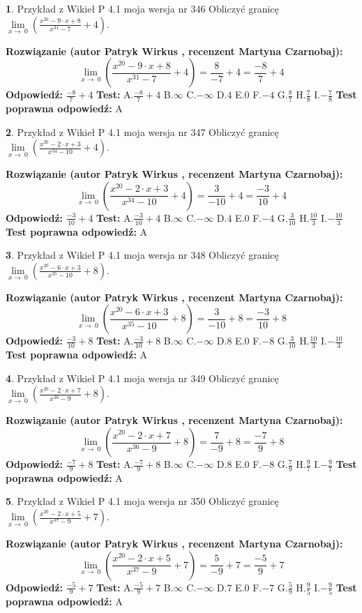 \documentclass[12pt, a4paper]{article}
\theoremstyle{definition} %
\newtheorem{zad}{}
\newcommand{\zadStart}[1]{\begin{zad}#1\newline}
\newcommand{\zadStop}{\end{zad}}
\newcommand{\rozwStart}[2]{\noindent \textbf{Rozwiązanie (autor #1 , recenzent #2): }\newline}
\newcommand{\rozwStop}{\newline}
\newcommand{\odpStart}{\noindent \textbf{Odpowiedź:}\newline}
\newcommand{\odpStop}{\newline}
\newcommand{\testStart}{\noindent \textbf{Test:}\newline}
\newcommand{\testStop}{\newline}
\newcommand{\kluczStart}{\noindent \textbf{Test poprawna odpowiedź:}\newline}
\newcommand{\kluczStop}{\newline}
\begin{document}
\zadStart{Przykład z Wikieł P 4.1 moja wersja nr 346}
Obliczyć granicę $\lim\limits_{x\to\ 0}(\frac{x^{20}-9 \cdot x +8}{x^{31}-7}+4)$.
\zadStop
\rozwStart{Patryk Wirkus}{Martyna Czarnobaj}
$$\lim\limits_{x\to\ 0}(\frac{x^{20}-9 \cdot x +8}{x^{31}-7}+4)=\frac{8}{-7}+4=\frac{-8}{7}+4$$
\rozwStop
\odpStart
$\frac{-8}{7}+4$
\odpStop
\testStart
A.$\frac{-8}{7}+4$
B.$\infty$
C.$-\infty$
D.$4$
E.$0$
F.$-4$
G.$\frac{8}{7}$
H.$\frac{7}{8}$
I.$-\frac{7}{8}$
\testStop
\kluczStart
A
\kluczStop



\zadStart{Przykład z Wikieł P 4.1 moja wersja nr 347}
Obliczyć granicę $\lim\limits_{x\to\ 0}(\frac{x^{20}-2 \cdot x +3}{x^{34}-10}+4)$.
\zadStop
\rozwStart{Patryk Wirkus}{Martyna Czarnobaj}
$$\lim\limits_{x\to\ 0}(\frac{x^{20}-2 \cdot x +3}{x^{34}-10}+4)=\frac{3}{-10}+4=\frac{-3}{10}+4$$
\rozwStop
\odpStart
$\frac{-3}{10}+4$
\odpStop
\testStart
A.$\frac{-3}{10}+4$
B.$\infty$
C.$-\infty$
D.$4$
E.$0$
F.$-4$
G.$\frac{3}{10}$
H.$\frac{10}{3}$
I.$-\frac{10}{3}$
\testStop
\kluczStart
A
\kluczStop



\zadStart{Przykład z Wikieł P 4.1 moja wersja nr 348}
Obliczyć granicę $\lim\limits_{x\to\ 0}(\frac{x^{20}-6 \cdot x +3}{x^{35}-10}+8)$.
\zadStop
\rozwStart{Patryk Wirkus}{Martyna Czarnobaj}
$$\lim\limits_{x\to\ 0}(\frac{x^{20}-6 \cdot x +3}{x^{35}-10}+8)=\frac{3}{-10}+8=\frac{-3}{10}+8$$
\rozwStop
\odpStart
$\frac{-3}{10}+8$
\odpStop
\testStart
A.$\frac{-3}{10}+8$
B.$\infty$
C.$-\infty$
D.$8$
E.$0$
F.$-8$
G.$\frac{3}{10}$
H.$\frac{10}{3}$
I.$-\frac{10}{3}$
\testStop
\kluczStart
A
\kluczStop



\zadStart{Przykład z Wikieł P 4.1 moja wersja nr 349}
Obliczyć granicę $\lim\limits_{x\to\ 0}(\frac{x^{20}-2 \cdot x +7}{x^{36}-9}+8)$.
\zadStop
\rozwStart{Patryk Wirkus}{Martyna Czarnobaj}
$$\lim\limits_{x\to\ 0}(\frac{x^{20}-2 \cdot x +7}{x^{36}-9}+8)=\frac{7}{-9}+8=\frac{-7}{9}+8$$
\rozwStop
\odpStart
$\frac{-7}{9}+8$
\odpStop
\testStart
A.$\frac{-7}{9}+8$
B.$\infty$
C.$-\infty$
D.$8$
E.$0$
F.$-8$
G.$\frac{7}{9}$
H.$\frac{9}{7}$
I.$-\frac{9}{7}$
\testStop
\kluczStart
A
\kluczStop



\zadStart{Przykład z Wikieł P 4.1 moja wersja nr 350}
Obliczyć granicę $\lim\limits_{x\to\ 0}(\frac{x^{20}-2 \cdot x +5}{x^{37}-9}+7)$.
\zadStop
\rozwStart{Patryk Wirkus}{Martyna Czarnobaj}
$$\lim\limits_{x\to\ 0}(\frac{x^{20}-2 \cdot x +5}{x^{37}-9}+7)=\frac{5}{-9}+7=\frac{-5}{9}+7$$
\rozwStop
\odpStart
$\frac{-5}{9}+7$
\odpStop
\testStart
A.$\frac{-5}{9}+7$
B.$\infty$
C.$-\infty$
D.$7$
E.$0$
F.$-7$
G.$\frac{5}{9}$
H.$\frac{9}{5}$
I.$-\frac{9}{5}$
\testStop
\kluczStart
A
\kluczStop
\end{document}
